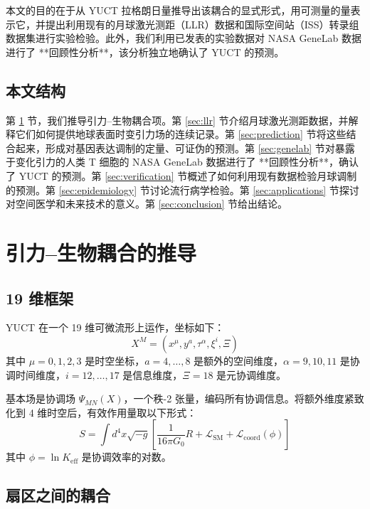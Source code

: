 \documentclass[12pt,a4paper]{article}
\theoremstyle{remark}
\newcommand{\Keff}{K_{\mathrm{eff}}}
\begin{document}
	本文的目的在于从 YUCT 拉格朗日量推导出该耦合的显式形式，用可测量的量表示它，并提出利用现有的月球激光测距（LLR）数据和国际空间站（ISS）转录组数据集进行实验检验。此外，我们利用已发表的实验数据对 NASA GeneLab 数据进行了 **回顾性分析**，该分析独立地确认了 YUCT 的预测。
	
	\subsection{本文结构}
	
	第 \ref{sec:derivation} 节，我们推导引力–生物耦合项。第 \ref{sec:llr} 节介绍月球激光测距数据，并解释它们如何提供地球表面时变引力场的连续记录。第 \ref{sec:prediction} 节将这些结合起来，形成对基因表达调制的定量、可证伪的预测。第 \ref{sec:genelab} 节对暴露于变化引力的人类 T 细胞的 NASA GeneLab 数据进行了 **回顾性分析**，确认了 YUCT 的预测。第 \ref{sec:verification} 节概述了如何利用现有数据检验月球调制的预测。第 \ref{sec:epidemiology} 节讨论流行病学检验。第 \ref{sec:applications} 节探讨对空间医学和未来技术的意义。第 \ref{sec:conclusion} 节给出结论。
	
	\section{引力–生物耦合的推导}
	\label{sec:derivation}
	
	\subsection{19 维框架}
	
	YUCT 在一个 19 维可微流形上运作，坐标如下：
	\[
	X^M = (x^\mu, y^a, \tau^\alpha, \xi^i, \Xi)
	\]
	其中 \(\mu = 0,1,2,3\) 是时空坐标，\(a = 4,\dots,8\) 是额外的空间维度，\(\alpha = 9,10,11\) 是协调时间维度，\(i = 12,\dots,17\) 是信息维度，\(\Xi = 18\) 是元协调维度。
	
	基本场是协调场 \(\Psi_{MN}(X)\)，一个秩-2 张量，编码所有协调信息。将额外维度紧致化到 4 维时空后，有效作用量取以下形式：
	\begin{equation}
		S = \int d^4x \sqrt{-g} \left[ \frac{1}{16\pi G_0} R + \mathcal{L}_{\text{SM}} + \mathcal{L}_{\text{coord}}(\phi) \right]
		\label{eq:action}
	\end{equation}
	其中 \(\phi = \ln \Keff\) 是协调效率的对数。
	
	\subsection{扇区之间的耦合}
	
\end{document}
